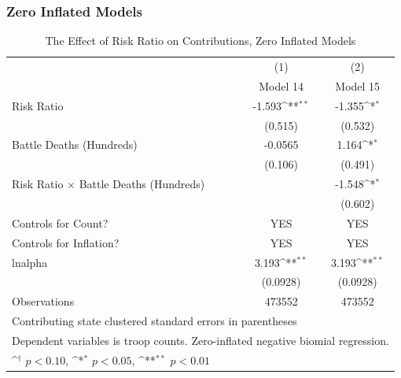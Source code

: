 \documentclass{beamer}
\begin{document}
\begin{frame}[fragile]
\frametitle{Zero Inflated Models}

\begin{table}[htbp]\centering
\tiny
\def\sym#1{\ifmmode^{#1}\else\(^{#1}\)\fi}
\caption{The Effect of Risk Ratio on Contributions, Zero Inflated Models}
\vspace{0.4cm}
\begin{tabular}{l*{2}{c}}
\hline\hline
                    &\multicolumn{1}{c}{(1)}        &\multicolumn{1}{c}{(2)}        \\
                    &         Model 14        &         Model 15        \\
\hline
Risk Ratio          &      -1.593\sym{**}&      -1.355\sym{*} \\
                    &     (0.515)        &     (0.532)        \\
[1em]
Battle Deaths (Hundreds)&     -0.0565        &       1.164\sym{*} \\
                    &     (0.106)        &     (0.491)        \\
[1em]
Risk Ratio $\times$ Battle Deaths (Hundreds)&                    &      -1.548\sym{*} \\
                    &                    &     (0.602)        \\
[1em]
Controls for Count? &     YES            &       YES          \\
[1em]
Controls for Inflation? &        YES     &       YES          \\
[1em]
lnalpha             &       3.193\sym{**}&       3.193\sym{**}\\
                    &    (0.0928)        &    (0.0928)        \\
\hline
Observations        &      473552        &      473552        \\
\hline\hline
\multicolumn{3}{l}{\tiny Contributing state clustered standard errors in parentheses}\\
\multicolumn{3}{l}{\tiny Dependent variables is troop counts. Zero-inflated negative biomial regression.}\\
\multicolumn{3}{l}{\tiny \sym{\dagger} \(p<0.10\), \sym{*} \(p<0.05\), \sym{**} \(p<0.01\)}\\
\end{tabular}
\end{table}

\end{frame}
\end{document}
